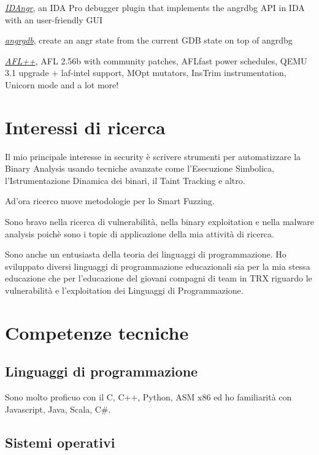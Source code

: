 \documentclass[10pt, a4paper]{article}
\newcommand{\years}[1]{\marginnote{\scriptsize #1}}
\begin{document}
\years{2018}\href{https://andreafioraldi.github.io/IDAngr/}{\emph{IDAngr}}, an IDA Pro debugger plugin that implements the angrdbg API in IDA with an user-friendly GUI

\years{2018}\href{https://github.com/andreafioraldi/angrgbg}{\emph{angrgdb}}, create an angr state from the current GDB state on top of angrdbg

\years{2019}\href{https://github.com/vanhauser-thc/AFLplusplus}{\emph{AFL++}}, AFL 2.56b with community patches, AFLfast power schedules, QEMU 3.1 upgrade + laf-intel support, MOpt mutators, InsTrim instrumentation, Unicorn mode and a lot more! 

\section*{Interessi di ricerca}

Il mio principale interesse in security è scrivere strumenti per automatizzare la Binary Analysis
usando tecniche avanzate come l'Esecuzione Simbolica, l'Istrumentazione Dinamica dei binari,
il Taint Tracking e altro.

Ad'ora ricerco nuove metodologie per lo Smart Fuzzing.

Sono bravo nella ricerca di vulnerabilità, nella binary exploitation e nella malware analysis
poichè sono i topic di applicazione della mia attività di ricerca.

Sono anche un entusiasta della teoria dei linguaggi di programmazione.
Ho sviluppato diversi linguaggi di programmazione educazionali sia per la mia
stessa educazione che per l'educazione del giovani compagni di team in TRX
riguardo le vulnerabilità e l'exploitation dei Linguaggi di Programmazione.

\section*{Competenze tecniche}

\subsection*{Linguaggi di programmazione}

Sono molto proficuo con il C, C++, Python, ASM x86 ed ho familiarità con Javascript, Java, Scala, C\#.

\subsection*{Sistemi operativi}
\end{document}
